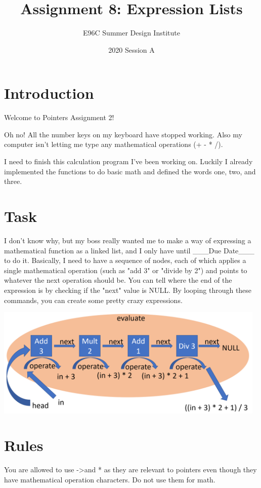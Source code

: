 \documentclass[12pt]{article}
\title{Assignment 8: Expression Lists}
\author{E96C Summer Design Institute}
\date{2020 Session A}
\begin{document}
\maketitle

\section{Introduction}
Welcome to Pointers Assignment 2!

Oh no! All the number keys on my keyboard have stopped working. Also my computer isn't letting me type any mathematical operations (+ - * /).

I need to finish this calculation program I've been working on. Luckily I already implemented the functions to do basic math and defined the words one, two, and three.


\section{Task}
I don't know why, but my boss really wanted me to make a way of expressing a mathematical function as a linked list, and I only have until \_\_\_Due Date\_\_\_ to do it. Basically, I need to have a sequence of nodes, each of which applies a single mathematical operation (such as "add 3" or "divide by 2") and points to whatever the next operation should be. You can tell where the end of the expression is by checking if the "next" value is NULL. By looping through these commands, you can create some pretty crazy expressions.

\begin{center}
\includegraphics[width=13cm]{images/betterDiagram.png}
\end{center}

\section{Rules}

You are allowed to use -\textgreater  and * as they are relevant to pointers even though they have mathematical operation characters. Do not use them for math.
\end{document}
